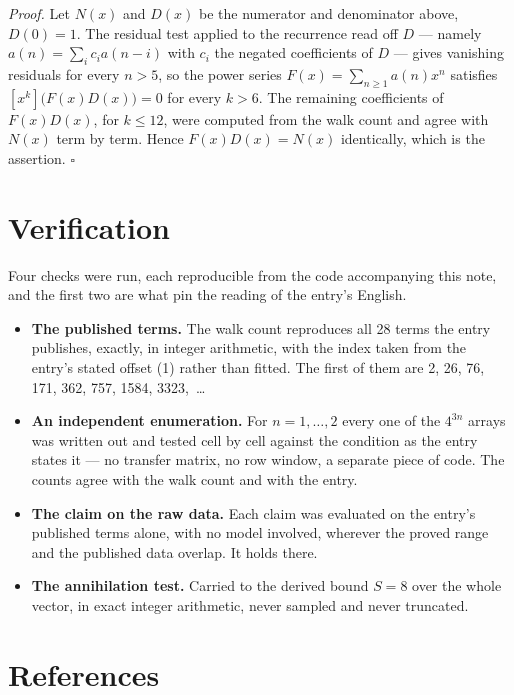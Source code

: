 \documentclass[11pt]{article}
\theoremstyle{definition}
\begin{document}
{\itshape Proof.} Let $N(x)$ and $D(x)$ be the numerator and denominator above, $D(0)=1$. The residual test applied to the recurrence read off $D$ --- namely $a(n) = \sum_i c_i a(n-i)$ with $c_i$ the negated coefficients of $D$ --- gives vanishing residuals for every $n > 5$, so the power series $F(x)=\sum_{n\ge 1}a(n)x^n$ satisfies $[x^k]\bigl(F(x)D(x)\bigr) = 0$ for every $k > 6$. The remaining coefficients of $F(x)D(x)$, for $k \le 12$, were computed from the walk count and agree with $N(x)$ term by term. Hence $F(x)D(x) = N(x)$ identically, which is the assertion. $\square$

\section{Verification}

Four checks were run, each reproducible from the code accompanying this note, and the first two are what pin the reading of the entry's English.

\begin{itemize}

\item {\bfseries The published terms.} The walk count reproduces all 28 terms the entry publishes, exactly, in integer arithmetic, with the index taken from the entry's stated offset (1) rather than fitted. The first of them are 2, 26, 76, 171, 362, 757, 1584, 3323,~\dots

\item {\bfseries An independent enumeration.} For $n = 1,\dots,2$ every one of the $4^{3n}$ arrays was written out and tested cell by cell against the condition as the entry states it --- no transfer matrix, no row window, a separate piece of code. The counts agree with the walk count and with the entry.

\item {\bfseries The claim on the raw data.} Each claim was evaluated on the entry's published terms alone, with no model involved, wherever the proved range and the published data overlap. It holds there.

\item {\bfseries The annihilation test.} Carried to the derived bound $S = 8$ over the whole vector, in exact integer arithmetic, never sampled and never truncated.

\end{itemize}

\section{References}
\end{document}
